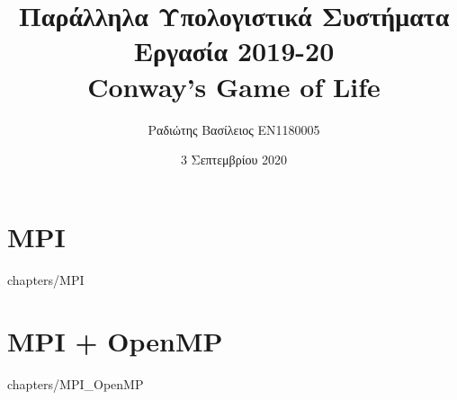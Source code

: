\documentclass[a4paper,twoside,12pt]{report}
\title {Παράλληλα Υπολογιστικά Συστήματα\\Εργασία 2019-20\\Conway’s Game of Life}
\author {Ραδιώτης Βασίλειος EN1180005}
\date {3 Σεπτεμβρίου 2020}
\begin{document}
\maketitle

\tableofcontents{}

\chapter {MPI}
     {chapters/MPI}

\chapter {MPI + OpenMP}
     {chapters/MPI_OpenMP}
\end{document}
